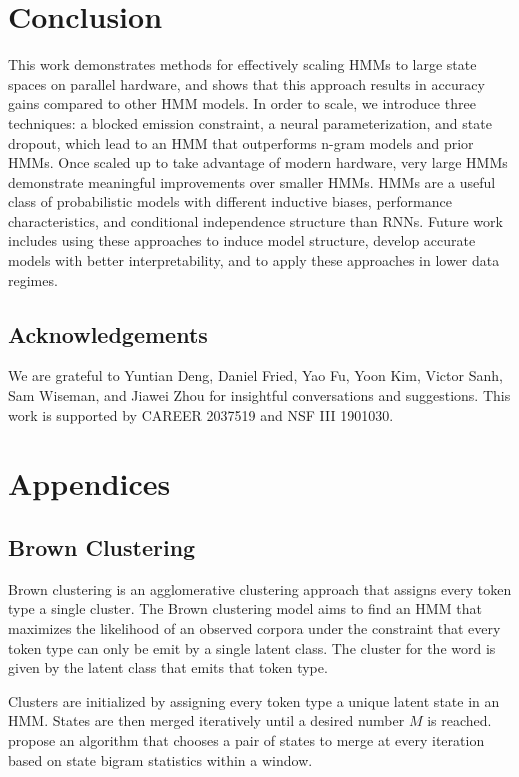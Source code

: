 \documentclass[11pt,a4paper]{article}
\begin{document}
\section{Conclusion}
This work demonstrates methods for effectively scaling HMMs to large state spaces on parallel 
hardware, and shows that this approach results in accuracy gains compared to other HMM models.
In order to scale, we introduce three techniques:
a blocked emission constraint, a neural parameterization,
and state dropout, which lead to an HMM that outperforms n-gram models and prior HMMs.
Once scaled up to take advantage of modern hardware,
very large HMMs demonstrate meaningful improvements over smaller HMMs.
HMMs are a useful class of probabilistic models with different inductive biases, 
performance characteristics, and conditional independence structure than RNNs. 
Future work includes using these approaches to induce model structure, develop accurate models 
with better interpretability, and to apply these approaches in lower data regimes. 


\subsection*{Acknowledgements}
We are grateful to
Yuntian Deng, Daniel Fried, Yao Fu, Yoon Kim, Victor Sanh, Sam Wiseman, and Jiawei Zhou
for insightful conversations and suggestions.  This work is supported by CAREER 2037519 and NSF III 1901030.





\appendix

\section{Appendices}

\subsection{Brown Clustering}
Brown clustering is an agglomerative clustering approach \citep{brown1992,liang2005brown}
that assigns every token type a single cluster.
The Brown clustering model aims to find an HMM that maximizes the likelihood of
an observed corpora under the constraint that every token type can only be emit
by a single latent class.
The cluster for the word is given by the latent class that emits that token type.

Clusters are initialized by assigning every token type a unique latent state in an HMM.
States are then merged iteratively until a desired number $M$ is reached.
\citet{liang2005brown} propose an algorithm that chooses a pair of states
to merge at every iteration based on state bigram statistics within a window.
\end{document}
